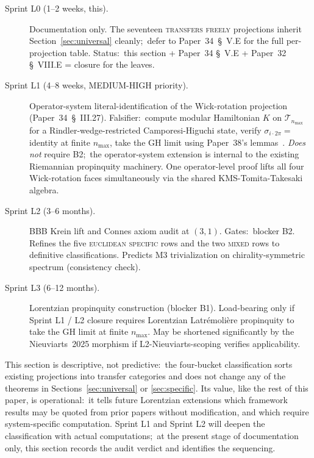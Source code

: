 \documentclass[twocolumn,pra,amsmath,amssymb,superscriptaddress]{revtex4-2}
\begin{document}
\begin{description}
\item[Sprint L0 (1--2 weeks, this).]  Documentation only.  The
  seventeen \textsc{transfers freely} projections inherit
  Section~\ref{sec:universal} cleanly;\ defer to Paper~34~\S~V.E
  for the full per-projection table.  Status:\ this section + Paper~34
  \S~V.E + Paper~32 \S~VIII.E = closure for the leaves.
\item[Sprint L1 (4--8 weeks, MEDIUM-HIGH priority).]
  Operator-system literal-identification of the Wick-rotation
  projection (Paper~34~\S~III.27).  Falsifier:\ compute modular
  Hamiltonian $K$ on $\mathcal{T}_{n_{\max}}$ for a Rindler-wedge-restricted
  Camporesi-Higuchi state, verify $\sigma_{i \cdot 2\pi} = $ identity
  at finite $n_{\max}$, take the GH limit using Paper~38's
  lemmas~\cite{paper38}.  \emph{Does not} require B2;\ the
  operator-system extension is internal to the existing Riemannian
  propinquity machinery.  One operator-level proof lifts all four
  Wick-rotation faces simultaneously via the shared KMS-Tomita-Takesaki
  algebra.
\item[Sprint L2 (3--6 months).]  BBB Krein lift and Connes axiom audit
  at $(3, 1)$.  Gates:\ blocker B2.  Refines the five
  \textsc{euclidean specific} rows and the two \textsc{mixed} rows to
  definitive classifications.  Predicts M3 trivialization on
  chirality-symmetric spectrum (consistency check).
\item[Sprint L3 (6--12 months).]  Lorentzian propinquity construction
  (blocker B1).  Load-bearing only if Sprint L1 / L2 closure requires
  Lorentzian Latr\'emoli\`ere propinquity to take the GH limit at
  finite $n_{\max}$.  May be shortened significantly by the
  Nieuviarts~2025 morphism if L2-Nieuviarts-scoping verifies
  applicability.
\end{description}

This section is descriptive, not predictive:\ the four-bucket
classification sorts existing projections into transfer categories
and does not change any of the theorems in
Sections~\ref{sec:universal} or \ref{sec:specific}.
Its value, like the rest of this paper, is operational:\ it tells
future Lorentzian extensions which framework results may be quoted
from prior papers without modification, and which require
system-specific computation.  Sprint L1 and Sprint L2 will deepen the
classification with actual computations;\ at the present stage of
documentation only, this section records the audit verdict and
identifies the sequencing.
\end{document}
